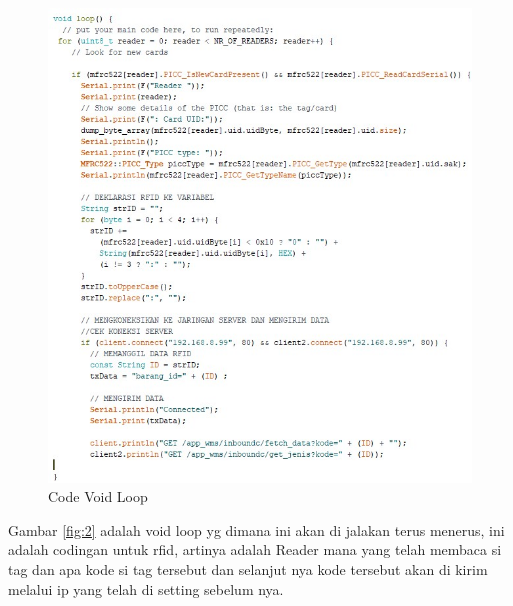 \begin{enumerate}
\begin{figure}[!htbp]
\centering
\includegraphics[width=.75\textwidth]{figures/CONV/cov2.jpg}
\caption{Code Void Loop}\label{fig:cov2}
\end{figure}

\subitem Gambar \ref{fig:2} adalah void loop yg dimana ini akan di jalakan terus menerus, ini adalah codingan untuk rfid, artinya adalah Reader mana yang telah membaca si tag dan apa kode si tag tersebut dan selanjut nya kode tersebut akan di kirim melalui ip yang telah di setting sebelum nya.
\end{enumerate}

